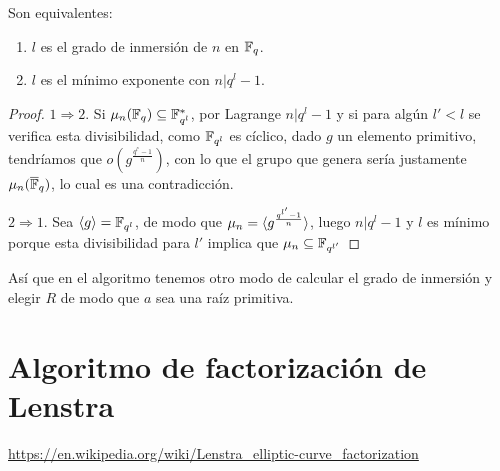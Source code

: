 \documentclass[CR.tex]{subfiles}
\begin{document}
\begin{lemma}
Son equivalentes:
\begin{enumerate}
\item $l$ es el grado de inmersión de $n$ en $\mathbb{F}_q$. 
\item $l$ es el mínimo exponente con $n|q^l-1$. 
\end{enumerate}
\end{lemma}
\begin{proof}
$1\Rightarrow 2$. Si $\mu_n(\mathbb{F}_q)\subseteq \mathbb{F}_{q^l}^*$, por Lagrange $n|q^l-1$ y si para algún $l'<l$ se verifica esta divisibilidad, como $\mathbb{F}_{q^l}$ es cíclico, dado $g$ un elemento primitivo, tendríamos que $o(g^{\frac{q^{l'}-1}{n}})$, con lo que el grupo que genera sería justamente $\mu_n(\overline{\mathbb{F}}_q)$, lo cual es una contradicción. 

$2\Rightarrow 1$. Sea $\langle{g}\rangle=\mathbb{F}_{q^l}$, de modo que $\mu_n=\langle{g^{\frac{q^{l'}-1}{n}}}\rangle$, luego $n|q^l-1$ y $l$ es mínimo porque esta divisibilidad para $l'$ implica que $\mu_n\subseteq \mathbb{F}_{q^{l'}}$
\end{proof}


Así que en el algoritmo tenemos otro modo de calcular el grado de inmersión y elegir $R$ de modo que $a$ sea una raíz primitiva. 
\section{Algoritmo de factorización de Lenstra}
\url{https://en.wikipedia.org/wiki/Lenstra_elliptic-curve_factorization} 
\end{document}
